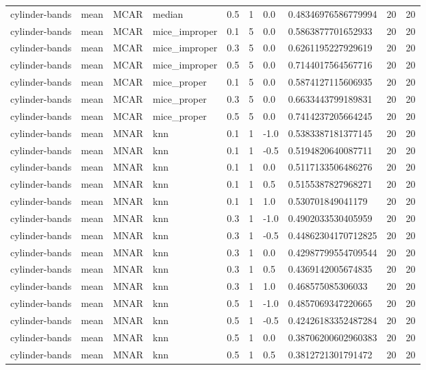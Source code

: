 \begin{tabular}{llllllllll}
cylinder-bands & mean & MCAR & median & 0.5 & 1 & 0.0 & 0.48346976586779994 & 20 & 20 \\
cylinder-bands & mean & MCAR & mice\_improper & 0.1 & 5 & 0.0 & 0.5863877701652933 & 20 & 20 \\
cylinder-bands & mean & MCAR & mice\_improper & 0.3 & 5 & 0.0 & 0.6261195227929619 & 20 & 20 \\
cylinder-bands & mean & MCAR & mice\_improper & 0.5 & 5 & 0.0 & 0.7144017564567716 & 20 & 20 \\
cylinder-bands & mean & MCAR & mice\_proper & 0.1 & 5 & 0.0 & 0.5874127115606935 & 20 & 20 \\
cylinder-bands & mean & MCAR & mice\_proper & 0.3 & 5 & 0.0 & 0.6633443799189831 & 20 & 20 \\
cylinder-bands & mean & MCAR & mice\_proper & 0.5 & 5 & 0.0 & 0.7414237205664245 & 20 & 20 \\
cylinder-bands & mean & MNAR & knn & 0.1 & 1 & -1.0 & 0.5383387181377145 & 20 & 20 \\
cylinder-bands & mean & MNAR & knn & 0.1 & 1 & -0.5 & 0.5194820640087711 & 20 & 20 \\
cylinder-bands & mean & MNAR & knn & 0.1 & 1 & 0.0 & 0.5117133506486276 & 20 & 20 \\
cylinder-bands & mean & MNAR & knn & 0.1 & 1 & 0.5 & 0.5155387827968271 & 20 & 20 \\
cylinder-bands & mean & MNAR & knn & 0.1 & 1 & 1.0 & 0.530701849041179 & 20 & 20 \\
cylinder-bands & mean & MNAR & knn & 0.3 & 1 & -1.0 & 0.4902033530405959 & 20 & 20 \\
cylinder-bands & mean & MNAR & knn & 0.3 & 1 & -0.5 & 0.44862304170712825 & 20 & 20 \\
cylinder-bands & mean & MNAR & knn & 0.3 & 1 & 0.0 & 0.42987799554709544 & 20 & 20 \\
cylinder-bands & mean & MNAR & knn & 0.3 & 1 & 0.5 & 0.4369142005674835 & 20 & 20 \\
cylinder-bands & mean & MNAR & knn & 0.3 & 1 & 1.0 & 0.468575085306033 & 20 & 20 \\
cylinder-bands & mean & MNAR & knn & 0.5 & 1 & -1.0 & 0.4857069347220665 & 20 & 20 \\
cylinder-bands & mean & MNAR & knn & 0.5 & 1 & -0.5 & 0.42426183352487284 & 20 & 20 \\
cylinder-bands & mean & MNAR & knn & 0.5 & 1 & 0.0 & 0.38706200602960383 & 20 & 20 \\
cylinder-bands & mean & MNAR & knn & 0.5 & 1 & 0.5 & 0.3812721301791472 & 20 & 20 \\

\end{tabular}
